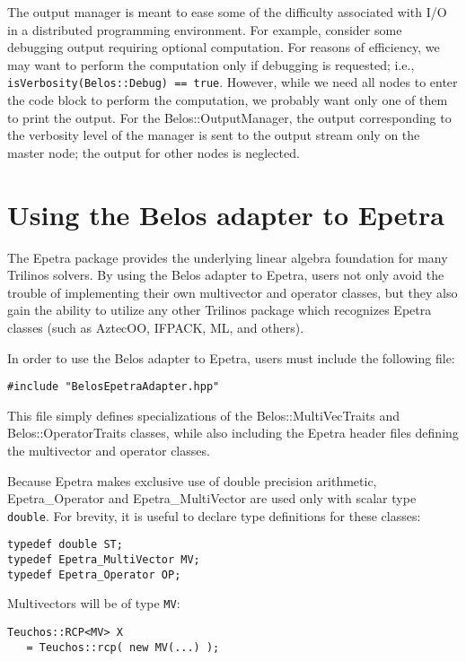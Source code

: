 The output manager is meant to ease some of the difficulty associated with I/O in a
distributed programming environment. For example, consider some debugging output requiring
optional computation. For reasons of efficiency, we may want to perform the computation
only if debugging is requested; i.e., \verb!isVerbosity(Belos::Debug) == true!. However,
while we need all nodes to enter the code block to perform the computation, we probably
want only one of them to print the output. For the Belos::OutputManager, the output 
corresponding to the verbosity level of the manager is sent to the output stream only on 
the master node; the output for other nodes is neglected.


\section{Using the Belos adapter to Epetra}
\label{sec:belos:epetra}

The Epetra package provides the underlying linear algebra foundation for many
Trilinos solvers.  By using the Belos adapter to Epetra, users not only
avoid the trouble of implementing their own multivector and operator classes, but
they also gain the ability to utilize any other Trilinos package which
recognizes Epetra classes (such as AztecOO, IFPACK, ML, and others).

In order to use the Belos adapter to Epetra, users must include the following
file:
\begin{verbatim}
#include "BelosEpetraAdapter.hpp"
\end{verbatim}
This file simply defines specializations of the Belos::MultiVecTraits
and Belos::Operator\-Traits classes, while also including the Epetra
header files defining the multivector and operator classes.

Because Epetra makes exclusive use of double precision arithmetic, 
Epetra\_Operator and Epetra\_MultiVector are used only with 
scalar type \verb!double!. For brevity, it is useful to declare type definitions
for these classes:
\begin{verbatim}
typedef double ST;
typedef Epetra_MultiVector MV;
typedef Epetra_Operator OP;
\end{verbatim}

\noindent Multivectors will be of type \verb!MV!:
\begin{verbatim}
Teuchos::RCP<MV> X 
   = Teuchos::rcp( new MV(...) );
\end{verbatim}

